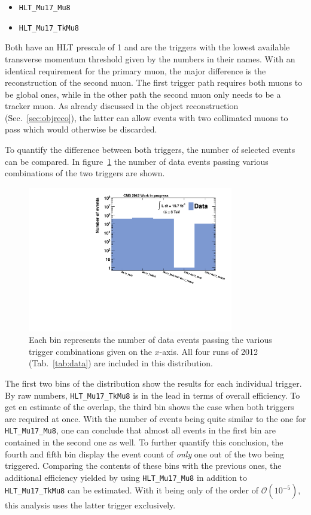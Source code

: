 \begin{itemize}
\item \verb+HLT_Mu17_Mu8+
\item \verb+HLT_Mu17_TkMu8+
\end{itemize}

Both have an HLT prescale of 1 and are the triggers with the lowest available transverse momentum threshold given by the numbers in their names. With an identical requirement for the primary muon, the major difference is the reconstruction of the second muon. The first trigger path requires both muons to be global ones, while in the other path the second muon only needs to be a tracker muon. As already discussed in the object reconstruction (Sec.~\ref{sec:objreco}), the latter can allow events with two collimated muons to pass which would otherwise be discarded.

To quantify the difference between both triggers, the number of selected events can be compared. In figure~\ref{fig:matched} the number of data events passing various combinations of the two triggers are shown.

\begin{figure}[ht!]
  \centering
    \includegraphics[width=0.8\textwidth]{plots/dycut_matched.pdf}
  \caption{Each bin represents the number of data events passing the various trigger combinations given on the $x$-axis. All four runs of 2012 (Tab.~\ref{tab:data}) are included in this distribution.}
  \label{fig:matched}
\end{figure}

\noindent The first two bins of the distribution show the results for each individual trigger. By raw numbers, \verb+HLT_Mu17_TkMu8+ is in the lead in terms of overall efficiency. To get en estimate of the overlap, the third bin shows the case when both triggers are required at once. With the number of events being quite similar to the one for \verb+HLT_Mu17_Mu8+, one can conclude that almost all events in the first bin are contained in the second one as well. To further quantify this conclusion, the fourth and fifth bin display the event count of \textit{only} one out of the two being triggered. Comparing the contents of these bins with the previous ones, the additional efficiency yielded by using \verb+HLT_Mu17_Mu8+ in addition to \verb+HLT_Mu17_TkMu8+ can be estimated. With it being only of the order of $\mathcal{O}(10^{-5})$, this analysis uses the latter trigger exclusively.


